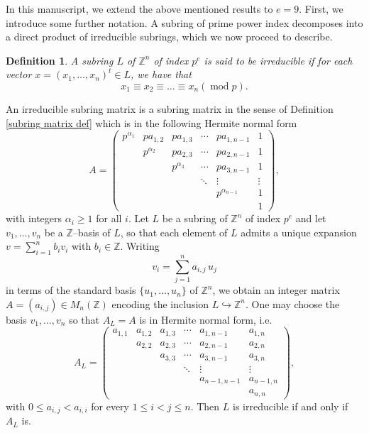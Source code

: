 \documentclass[a4paper]{amsart}
\newtheorem{definition}[theorem]{Definition}
\numberwithin{equation}{section}
\theoremstyle{remark}
\newcommand{\Z}{\mathbb{Z}}
\newcommand{\op}[1]{\operatorname{#1}}
\begin{document}
\par In this manuscript, we extend the above mentioned results to $e=9$. First, we introduce some further notation.
 A subring of prime power index decomposes into a direct product of irreducible subrings, which we now proceed to describe.
\begin{definition}
A subring $L$ of $\Z^n$ of index $p^e$ is said to be \emph{irreducible} if for each vector $x=(x_1, \dots, x_n)^t\in L$, we have that 
\[x_1\equiv x_2\equiv \dots \equiv x_n\left(\op{mod} p\right).\]
\end{definition}
\noindent An irreducible subring matrix is a subring matrix in the sense of Definition \ref{subring matrix def} which is in the following Hermite normal form
\begin{equation}\label{irreducible subring matrix}
A=\begin{pmatrix}
	 p^{\alpha_1}& p a_{1,2} & p a_{1,3} & \cdots & p a_{1,n-1}& 1 \\
	& p^{\alpha_2} & p a_{2,3} & \cdots & p a_{2,n-1} & 1\\
	&& p^{\alpha_3} & \cdots & p a_{3,n-1} & 1\\
	&&& \ddots & \vdots & \vdots\\
	&&&& p^{\alpha_{n-1}} & 1\\
	&&&&& 1
\end{pmatrix},
\end{equation}
with integers $\alpha_i\ge 1$ for all $i$. Let $L$ be a subring of $\Z^n$ of index $p^{e}$ and let $v_1,\dots,v_n$ be a $\mathbb{Z}$–basis of $L$, so that each element of $L$ admits a unique expansion $v=\sum_{i=1}^n b_i v_i$ with $b_i\in\mathbb{Z}$. Writing
\[
v_i=\sum_{j=1}^n a_{i,j}\, u_j
\]
in terms of the standard basis $\{u_1,\dots,u_n\}$ of $\Z^n$, we obtain an integer matrix $A=(a_{i,j})\in M_n(\mathbb{Z})$ encoding the inclusion $L\hookrightarrow \mathbb{Z}^n$. One may choose the basis $v_1,\dots,v_n$ so that $A_L=A$ is in Hermite normal form, i.e.
\[
A_L=\begin{pmatrix}
	a_{1,1} & a_{1,2} & a_{1,3} & \cdots & a_{1,n-1}& a_{1,n} \\
	& a_{2,2} & a_{2,3} & \cdots & a_{2,n-1} & a_{2,n}\\
	&& a_{3,3} & \cdots & a_{3,n-1} & a_{3,n}\\
	&&& \ddots & \vdots& \vdots\\
	&&&& a_{n-1,n-1} & a_{n-1,n}\\
	&&&&& a_{n,n}
\end{pmatrix},
\]
with $0\le a_{i,j}<a_{i,i}$ for every $1\le i<j\le n$. Then $L$ is irreducible if and only if $A_L$ is.
\end{document}
